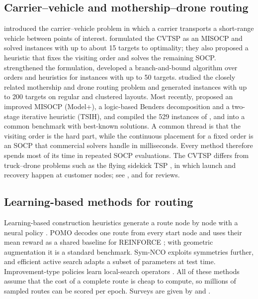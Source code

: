 \documentclass[preprint,review,12pt,authoryear]{elsarticle}
\begin{document}
\subsection{Carrier--vehicle and mothership--drone routing}
\citet{garone2010cooperative} introduced the carrier--vehicle problem in which a carrier transports a
short-range vehicle between points of interest. \citet{gambella2018exact} formulated the CVTSP as an MISOCP
and solved instances with up to about 15 targets to optimality; they also proposed a heuristic that
fixes the visiting order and solves the remaining SOCP. \citet{erdogan2021exact} strengthened the
formulation, developed a branch-and-bound algorithm over orders and heuristics for instances with up to 50 targets.
\citet{poikonen2020mothership} studied the closely related mothership and drone routing problem and
generated instances with up to 200 targets on regular and clustered layouts.
Most recently, \citet{li2025exact} proposed an improved MISOCP (Model+), a logic-based Benders decomposition
and a two-stage iterative heuristic (TSIH), and compiled the 529 instances of
\citet{gambella2018exact}, \citet{erdogan2021exact} and \citet{poikonen2020mothership} into a common benchmark
with best-known solutions. A common thread is that the visiting order is the hard part, while the
continuous placement for a fixed order is an SOCP \citep{lobo1998applications} that commercial solvers handle
in milliseconds. Every method therefore spends most of its time in repeated SOCP evaluations.
The CVTSP differs from truck--drone problems such as the flying sidekick TSP
\citep{murray2015flying,agatz2018optimization}, in which launch and recovery happen at customer nodes; see
\citet{otto2018optimization}, \citet{macrina2020drone} and \citet{chung2020optimization} for reviews.

\subsection{Learning-based methods for routing}
Learning-based construction heuristics generate a route node by node with a neural policy
\citep{vinyals2015pointer,nazari2018reinforcement,kool2019attention}. POMO \citep{kwon2020pomo} decodes one
route from every start node and uses their mean reward as a shared baseline for REINFORCE
\citep{williams1992simple}; with geometric augmentation it is a standard benchmark. Sym-NCO
\citep{kim2022symnco} exploits symmetries further, and efficient active search
\citep{hottung2022efficient} adapts a subset of parameters at test time. Improvement-type policies learn
local-search operators \citep{wu2022learning}. All of these methods assume that the cost of a complete route is
cheap to compute, so millions of sampled routes can be scored per epoch. Surveys are given by
\citet{bengio2021machine} and \citet{mazyavkina2021reinforcement}.
\end{document}
